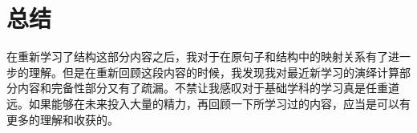 \documentclass{article}
\begin{document}
\section{总结}
在重新学习了结构这部分内容之后，我对于在原句子和结构中的映射关系有了进一步的理解。但是在重新回顾这段内容的时候，我发现我对最近新学习的演绎计算部分内容和完备性部分又有了疏漏。不禁让我感叹对于基础学科的学习真是任重道远。如果能够在未来投入大量的精力，再回顾一下所学习过的内容，应当是可以有更多的理解和收获的。


 
\end{document}
